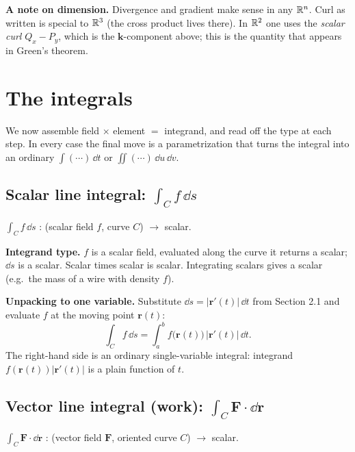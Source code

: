 \documentclass{essay}
\newcommand{\F}{\mathbf{F}}
\newcommand{\rr}{\mathbf{r}}
\begin{document}
\textbf{A note on dimension.} Divergence and gradient make sense in any \(\mathbb{R}^{n}\).
Curl as written is special to \(\mathbb{R}^{3}\) (the cross product lives there). In \(\mathbb{R}^{2}\) one
uses the \emph{scalar curl} \(Q_{x} - P_{y}\), which is the \(\mathbf{k}\)-component above;
this is the quantity that appears in Green's theorem.

\section{The integrals}

We now assemble field \(\times\) element \(=\) integrand, and read off the type at each
step. In every case the final move is a parametrization that turns the integral into
an ordinary \(\int(\cdots)\,\dd t\) or \(\iint(\cdots)\,\dd u\,\dd v\).

\subsection{Scalar line integral: \(\int_{C} f\,\dd s\)}

\begin{signature}
  \(\displaystyle \int_{C} f\,\dd s\) \;:\; (scalar field \(f\), curve \(C\)) \(\to\) scalar.
\end{signature}

\textbf{Integrand type.} \(f\) is a scalar field, evaluated along the curve it returns
a scalar; \(\dd s\) is a scalar. Scalar times scalar is scalar. Integrating scalars
gives a scalar (e.g.\ the mass of a wire with density \(f\)).

\textbf{Unpacking to one variable.} Substitute \(\dd s = \lvert\rr'(t)\rvert\,\dd t\)
from Section 2.1 and evaluate \(f\) at the moving point \(\rr(t)\):
\[ \int_{C} f\,\dd s = \int_{a}^{b} f\bigl(\rr(t)\bigr)\,\lvert\rr'(t)\rvert\,\dd t . \]
The right-hand side is an ordinary single-variable integral: integrand
\(f(\rr(t))\lvert\rr'(t)\rvert\) is a plain function of \(t\).

\subsection{Vector line integral (work): \(\int_{C} \F\cdot\dd\mathbf{r}\)}

\begin{signature}
  \(\displaystyle \int_{C} \F\cdot\dd\mathbf{r}\) \;:\; (vector field \(\F\), oriented curve
  \(C\)) \(\to\) scalar.
\end{signature}
\end{document}
